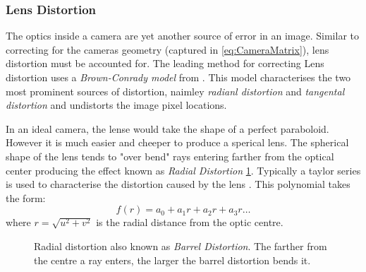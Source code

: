 \documentclass{UoNMCHA}
\numberwithin{equation}{section}
\begin{document}
\subsubsection{Lens Distortion}
The optics inside a camera are yet another source of error in an image. Similar to correcting for the cameras geometry (captured in \ref{eq:CameraMatrix}), lens distortion must be accounted for. The leading method for correcting Lens distortion uses a \textit{Brown-Conrady model} from \cite{fryer1986lens}. This model characterises the two most prominent sources of distortion, naimley \textit{radianl distortion} and \textit{tangental distortion} and undistorts the image pixel locations.

In an ideal camera, the lense would take the shape of a perfect paraboloid. However it is much easier and cheeper to produce a sperical lens. The spherical shape of the lens tends to "over bend" rays entering farther from the optical center producing the effect known as \textit{Radial Distortion} \cref{fig:RadialDistortion}. Typically a taylor series is used to characterise the distortion caused by the lens \cite{learningOpenCV}. This polynomial takes the form:
\begin{equation}
	f(r) = a_{0} + a_{1}r + a_{2}r + a_{3}r\dots
\end{equation}
where $r = \sqrt{u^{2} + v^{2}}$ is the radial distance from the optic centre.

\begin{figure}[ht]
	\caption{Radial distortion also known as \textit{Barrel Distortion}. The farther from the centre a ray enters, the larger the barrel distortion bends it.}	
	\label{fig:RadialDistortion}
\end{figure}
\end{document}
